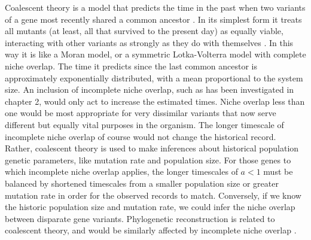 Coalescent theory is a model that predicts the time in the past when two variants of a gene most recently shared a common ancestor \cite{Kingman1982,Rouzine2001,Blythe2007,Rogers2014}. 
In its simplest form it treats all mutants (at least, all that survived to the present day) as equally viable, interacting with other variants as strongly as they do with themselves \cite{Ricklefs2006,Rosindell2011}. 
In this way it is like a Moran model, or a symmetric Lotka-Volterra model with complete niche overlap. 
The time it predicts since the last common ancestor is approximately exponentially distributed, with a mean proportional to the system size. %
An inclusion of incomplete niche overlap, such as has been investigated in chapter 2, would only act to increase the estimated times. 
Niche overlap less than one would be most appropriate for very dissimilar variants that now serve different but equally vital purposes in the organism. 
The longer timescale of incomplete niche overlap of course would not change the historical record. 
Rather, coalescent theory is used to make inferences about historical population genetic parameters, like mutation rate and population size. 
For those genes to which incomplete niche overlap applies, the longer timescales of $a<1$ must be balanced by shortened timescales from a smaller population size or greater mutation rate in order for the observed records to match. 
Conversely, if we know the historic population size and mutation rate, we could infer the niche overlap between disparate gene variants. 
Phylogenetic reconstruction is related to coalescent theory, and would be similarly affected by incomplete niche overlap \cite{Ricklefs2006}. %


